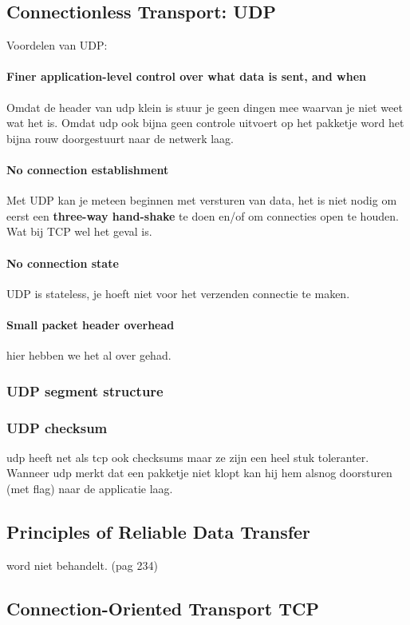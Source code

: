 \subsection{Connectionless Transport: UDP}
Voordelen van UDP:
\paragraph{Finer application-level control over what data is sent, and when} Omdat de header van udp klein is stuur je geen dingen mee waarvan je niet weet wat het is. Omdat udp ook bijna geen controle uitvoert op het pakketje word het bijna rouw doorgestuurt naar de netwerk laag.
\paragraph{No connection establishment} Met UDP kan je meteen beginnen met versturen van data, het is niet nodig om eerst een \textbf{three-way hand-shake} te doen en/of om connecties open te houden. Wat bij TCP wel het geval is.
\paragraph{No connection state} UDP is stateless, je hoeft niet voor het verzenden connectie te maken.
\paragraph{Small packet header overhead} hier hebben we het al over gehad.
\subsubsection{UDP segment structure}
\subsubsection{UDP checksum}
udp heeft net als tcp ook checksums maar ze zijn een heel stuk toleranter. Wanneer udp merkt dat een pakketje niet klopt kan hij hem alsnog doorsturen (met flag) naar de applicatie laag.
\subsection{Principles of Reliable Data Transfer}
word niet behandelt. (pag 234)
\subsection{Connection-Oriented Transport TCP}
